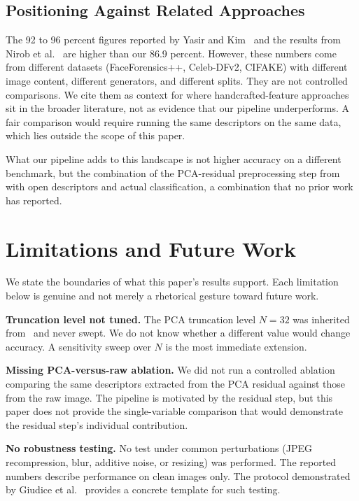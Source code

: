 \documentclass[runningheads]{llncs}
\begin{document}
\subsection{Positioning Against Related Approaches}

The 92 to 96 percent figures reported by Yasir and Kim~\cite{yasir2025} and the results from Nirob et al.~\cite{nirob2026} are higher than our 86.9 percent. However, these numbers come from different datasets (FaceForensics++, Celeb-DFv2, CIFAKE) with different image content, different generators, and different splits. They are not controlled comparisons. We cite them as context for where handcrafted-feature approaches sit in the broader literature, not as evidence that our pipeline underperforms. A fair comparison would require running the same descriptors on the same data, which lies outside the scope of this paper.

What our pipeline adds to this landscape is not higher accuracy on a different benchmark, but the combination of the PCA-residual preprocessing step from~\cite{xie2026} with open descriptors and actual classification, a combination that no prior work has reported.


\section{Limitations and Future Work}
\label{sec:limitations}

We state the boundaries of what this paper's results support. Each limitation below is genuine and not merely a rhetorical gesture toward future work.

\textbf{Truncation level not tuned.} The PCA truncation level $N = 32$ was inherited from~\cite{xie2026} and never swept. We do not know whether a different value would change accuracy. A sensitivity sweep over $N$ is the most immediate extension.

\textbf{Missing PCA-versus-raw ablation.} We did not run a controlled ablation comparing the same descriptors extracted from the PCA residual against those from the raw image. The pipeline is motivated by the residual step, but this paper does not provide the single-variable comparison that would demonstrate the residual step's individual contribution.

\textbf{No robustness testing.} No test under common perturbations (JPEG recompression, blur, additive noise, or resizing) was performed. The reported numbers describe performance on clean images only. The protocol demonstrated by Giudice et al.~\cite{giudice2021} provides a concrete template for such testing.
\end{document}
